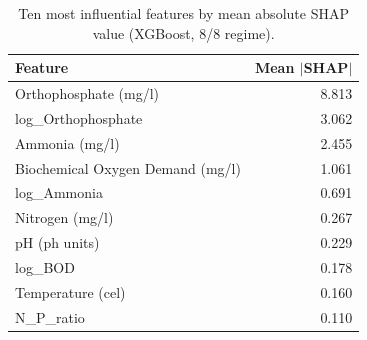 \begin{table}[!t]
    \centering
    \caption{Ten most influential features by mean absolute SHAP value (XGBoost, 8/8 regime).}
    \label{tab:shap}
    \small
    \setlength{\tabcolsep}{4pt}
    \begin{tabular}{lr}
        \toprule
        Feature & Mean $|$SHAP$|$ \\
        \midrule
        Orthophosphate (mg/l) & 8.813 \\
        log\_Orthophosphate & 3.062 \\
        Ammonia (mg/l) & 2.455 \\
        Biochemical Oxygen Demand (mg/l) & 1.061 \\
        log\_Ammonia & 0.691 \\
        Nitrogen (mg/l) & 0.267 \\
        pH (ph units) & 0.229 \\
        log\_BOD & 0.178 \\
        Temperature (cel) & 0.160 \\
        N\_P\_ratio & 0.110 \\
        \bottomrule
    \end{tabular}
\end{table}
